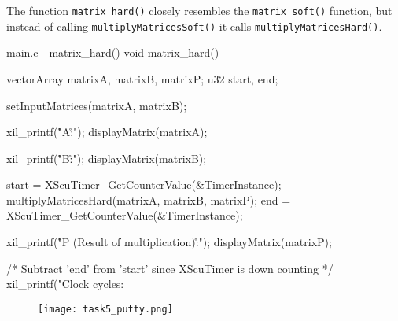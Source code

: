 \documentclass[../main.tex]{subfiles}
\begin{document}
\newpage

The function \texttt{matrix\_hard()} closely resembles the \texttt{matrix\_soft()} function, but instead of calling \texttt{multiplyMatricesSoft()} it calls \texttt{multiplyMatricesHard()}.

\begin{myminted}{main.c - matrix\_hard()}
void matrix_hard()
{
	vectorArray matrixA, matrixB, matrixP;
	u32 start, end;

	setInputMatrices(matrixA, matrixB);

	xil_printf("\r\n\nMatrix A:\r\n");
	displayMatrix(matrixA);

	xil_printf("\r\n\nMatrix B:\r\n");
	displayMatrix(matrixB);

	start = XScuTimer_GetCounterValue(&TimerInstance);
	multiplyMatricesHard(matrixA, matrixB, matrixP);
	end = XScuTimer_GetCounterValue(&TimerInstance);

	xil_printf("\r\n\nMatrix P (Result of multiplication):\r\n");
	displayMatrix(matrixP);

	/* Subtract 'end' from 'start' since XScuTimer is down counting */
	xil_printf("Clock cycles: %
}
\end{myminted}

\begin{figure}[h]
    \centering
    \texttt{[image: task5\_putty.png]}
\end{figure}
\end{document}
